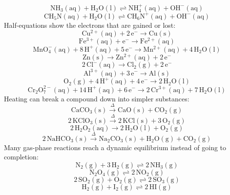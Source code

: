 \documentclass[11pt]{article}
\begin{document}
\label{eq054}\[
  \mathrm{NH_3(aq)} + \mathrm{H_2O(l)} \rightleftharpoons \mathrm{NH_4^+(aq)} + \mathrm{OH^-(aq)}
\]
\label{eq055}\[
  \mathrm{CH_5N(aq)} + \mathrm{H_2O(l)} \rightleftharpoons \mathrm{CH_6N^+(aq)} + \mathrm{OH^-(aq)}
\]
Half-equations show the electrons that are gained or lost:\nopagebreak
\label{eq056}\[
  \mathrm{Cu^{2+}(aq)} + 2\,\mathrm{e^-} \longrightarrow \mathrm{Cu(s)}
\]
\label{eq057}\[
  \mathrm{Fe^{3+}(aq)} + \mathrm{e^-} \longrightarrow \mathrm{Fe^{2+}(aq)}
\]
\label{eq058}\[
  \mathrm{MnO_4^-(aq)} + 8\,\mathrm{H^+(aq)} + 5\,\mathrm{e^-} \longrightarrow \mathrm{Mn^{2+}(aq)} + 4\,\mathrm{H_2O(l)}
\]
\label{eq059}\[
  \mathrm{Zn(s)} \longrightarrow \mathrm{Zn^{2+}(aq)} + 2\,\mathrm{e^-}
\]
\label{eq060}\[
  2\,\mathrm{Cl^-(aq)} \longrightarrow \mathrm{Cl_2(g)} + 2\,\mathrm{e^-}
\]
\label{eq061}\[
  \mathrm{Al^{3+}(aq)} + 3\,\mathrm{e^-} \longrightarrow \mathrm{Al(s)}
\]
\label{eq062}\[
  \mathrm{O_2(g)} + 4\,\mathrm{H^+(aq)} + 4\,\mathrm{e^-} \longrightarrow 2\,\mathrm{H_2O(l)}
\]
\label{eq063}\[
  \mathrm{Cr_2O_7^{2-}(aq)} + 14\,\mathrm{H^+(aq)} + 6\,\mathrm{e^-} \longrightarrow 2\,\mathrm{Cr^{3+}(aq)} + 7\,\mathrm{H_2O(l)}
\]
Heating can break a compound down into simpler substances:\nopagebreak
\label{eq064}\[
  \mathrm{CaCO_3(s)} \xrightarrow{\Delta} \mathrm{CaO(s)} + \mathrm{CO_2(g)}
\]
\label{eq065}\[
  2\,\mathrm{KClO_3(s)} \xrightarrow{\Delta} 2\,\mathrm{KCl(s)} + 3\,\mathrm{O_2(g)}
\]
\label{eq066}\[
  2\,\mathrm{H_2O_2(aq)} \longrightarrow 2\,\mathrm{H_2O(l)} + \mathrm{O_2(g)}
\]
\label{eq067}\[
  2\,\mathrm{NaHCO_3(s)} \xrightarrow{\Delta} \mathrm{Na_2CO_3(s)} + \mathrm{H_2O(g)} + \mathrm{CO_2(g)}
\]
Many gas-phase reactions reach a dynamic equilibrium instead of going to completion:\nopagebreak
\label{eq068}\[
  \mathrm{N_2(g)} + 3\,\mathrm{H_2(g)} \rightleftharpoons 2\,\mathrm{NH_3(g)}
\]
\label{eq069}\[
  \mathrm{N_2O_4(g)} \rightleftharpoons 2\,\mathrm{NO_2(g)}
\]
\label{eq070}\[
  2\,\mathrm{SO_2(g)} + \mathrm{O_2(g)} \rightleftharpoons 2\,\mathrm{SO_3(g)}
\]
\label{eq071}\[
  \mathrm{H_2(g)} + \mathrm{I_2(g)} \rightleftharpoons 2\,\mathrm{HI(g)}
\]
\end{document}
